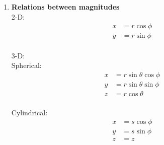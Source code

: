 \documentclass[12pt, oneside]{book}
\begin{document}
\begin{itemize}
   \begin{enumerate}
   	\item \textbf{Relations between magnitudes}\\
   	2-D: 
   	\begin{align}
   		x&=r\cos\phi \\
   		y&=r\sin\phi
   	\end{align}\\
   3-D: \\
   Spherical:\\
   \begin{align}
   	x&=r\sin\theta\cos\phi \\
   	y&=r\sin\theta\sin\phi \\
   	z&=r\cos\theta
   \end{align} \\

Cylindrical:\\
\begin{align}
	x&=s\cos \phi \\
	y&=s\sin \phi \\
	z&=z 
\end{align}
   

\end{enumerate}
\end{itemize}
\end{document}
